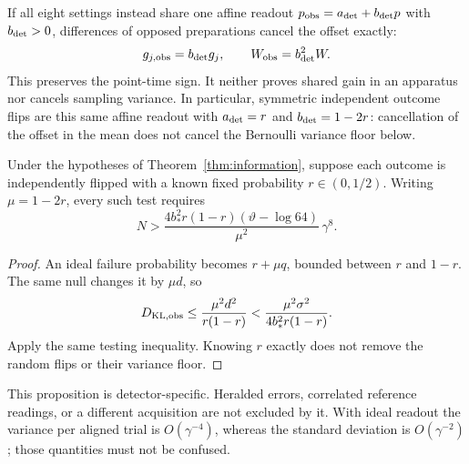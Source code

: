 If all eight settings instead share one affine readout
$p_{\rm obs}=a_{\rm det}+b_{\rm det}p$ with $b_{\rm det}>0$, differences of
opposed preparations cancel the offset exactly:
\[
 g_{j,\rm obs}=b_{\rm det}g_j,\qquad
 W_{\rm obs}=b_{\rm det}^2W.
\]
This preserves the point-time sign. It neither proves shared gain in an
apparatus nor cancels sampling variance.
In particular, symmetric independent outcome flips are this same affine
readout with $a_{\rm det}=r$ and $b_{\rm det}=1-2r$: cancellation of the
offset in the mean does not cancel the Bernoulli variance floor below.

\begin{proposition}
Under the hypotheses of Theorem~\ref{thm:information}, suppose each outcome
is independently flipped with a known fixed probability $r\in(0,1/2)$.
Writing $\mu=1-2r$, every such test requires
\[
 N>\frac{4b_*^2r(1-r)(\vartheta-\log64)}{\mu^2}\,\gamma^8.
\]
\end{proposition}
\begin{proof}
An ideal failure probability becomes $r+\mu q$, bounded between $r$ and
$1-r$. The same null changes it by $\mu d$, so
\[
 D_{\rm KL,obs}\leq\frac{\mu^2d^2}{r(1-r)}
       <\frac{\mu^2\sigma^2}{4b_*^2r(1-r)}.
\]
Apply the same testing inequality. Knowing $r$ exactly does not remove
the random flips or their variance floor.
\end{proof}
This proposition is detector-specific. Heralded errors, correlated reference
readings, or a different acquisition are not excluded by it. With ideal
readout the variance per aligned trial is $O(\gamma^{-4})$, whereas the
standard deviation is $O(\gamma^{-2})$; those quantities must not be confused.

